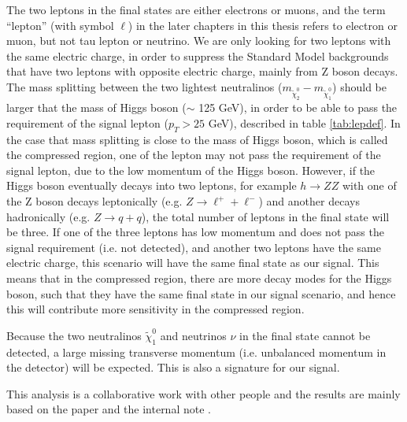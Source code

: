 The two leptons in the final states are either electrons or muons, and the term ``lepton'' (with symbol $\ell$) in the later chapters in this thesis refers to electron or muon, but not tau lepton or neutrino.
We are only looking for two leptons with the same electric charge, in order to suppress the Standard Model backgrounds that have two leptons with opposite electric charge, mainly from Z boson decays.
The mass splitting between the two lightest neutralinos ($m_{\tilde{\chi}_2^0} - m_{\tilde{\chi}_1^0}$) should be larger that the mass of Higgs boson ($\sim$ 125 GeV), in order to be able to pass the requirement of the signal lepton ($p_T > 25$ GeV), described in table \ref{tab:lepdef}.
In the case that mass splitting is close to the mass of Higgs boson, which is called the compressed region, one of the lepton may not pass the requirement of the signal lepton, due to the low momentum of the Higgs boson.
However, if the Higgs boson eventually decays into two leptons, for example $h \rightarrow ZZ$ with one of the Z boson decays leptonically (e.g. $Z \rightarrow \ell^{+} + \ell^{-}$) and another decays hadronically (e.g. $Z \rightarrow q + q$), the total number of leptons in the final state will be three.
If one of the three leptons has low momentum and does not pass the signal requirement (i.e. not detected), and another two leptons have the same electric charge, this scenario will have the same final state as our signal.
This means that in the compressed region, there are more decay modes for the Higgs boson, such that they have the same final state in our signal scenario, and hence this will contribute more sensitivity in the compressed region.

Because the two neutralinos $\tilde{\chi}_1^0$ and neutrinos $\nu$ in the final state cannot be detected, a large missing transverse momentum (i.e. unbalanced momentum in the detector) will be expected.
This is also a signature for our signal.

This analysis is a collaborative work with other people and the results are mainly based on the paper \cite{Wh} and the internal note \cite{WhSS}.
